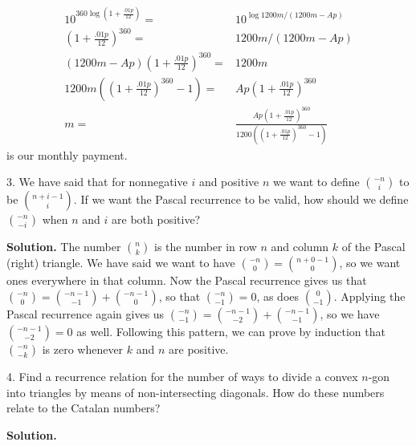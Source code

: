 \documentclass[10pt,]{book}
\theoremstyle{plain}
\theoremstyle{definition}
\theoremstyle{definition}
\numberwithin{equation}{chapter}
\newcommand{\amp}{&}
\begin{document}
\begin{exerciselist}
\begin{enumerate}[label=(\alph*)]
\begin{align*}
10^{360\log (1+\frac{.01p}{12})} =\amp 10^{\log
1200m/(1200m-Ap)}\\
(1+\frac{.01p}{12})^{360}  =\amp 1200m/(1200m-Ap)\\
\left(1200m-Ap\right)(1+\frac{.01p}{12})^{360} =\amp 1200m\\
1200m\left((1+\frac{.01p}{12})^{360}-1\right) =\amp  Ap(1+\frac{.01p}{12})^{360}\\
m  =\amp  \frac{Ap(1+\frac{.01p}{12})^{360}}{1200\left((1+\frac{.01p}{12})^{360}-1\right)}
\end{align*}
is our monthly payment.%
\end{enumerate}
%
\item[3.]\hypertarget{exercise-39}{}We have said that for nonnegative \(i\) and positive \(n\) we want to define \(\binom{-n}{i}\) to be \(\binom{n+i-1}{i}\). If we want the Pascal recurrence to be valid, how should we define \(\binom{-n}{-i}\) when \(n\) and \(i\) are both positive?%
\par\smallskip
\par\smallskip
\noindent\textbf{Solution.}\hypertarget{solution-360}{}\quad
The number \(\binom{n}{k}\) is the number in row \(n\) and column \(k\) of the Pascal (right) triangle. We have said we want to have \(\binom{-n}{0}=\binom{n+0-1}{0}\), so we want ones everywhere in that column. Now the Pascal recurrence gives us that \(\binom{-n}{0}=\binom{-n-1}{-1} +\binom{-n-1}{0}\), so that \(\binom{-n}{-1}=0\), as does \(\binom{0}{-1}\). Applying the Pascal recurrence again gives us \(\binom{-n}{-1}= \binom{-n-1}{-2} +\binom{-n-1}{-1}\), so we have \(\binom{-n-1}{-2}=0\) as well. Following this pattern, we can prove by induction that \(\binom{-n}{-k}\) is zero whenever \(k\) and \(n\) are positive.%
\item[4.]\hypertarget{exercise-40}{}Find a recurrence relation for the number of ways to divide a convex \(n\)-gon into triangles by means of non-intersecting diagonals.  How do these numbers relate to the Catalan numbers?%
\par\smallskip
\par\smallskip
\noindent\textbf{Solution.}\hypertarget{solution-361}{}\quad

\end{exerciselist}
\end{document}
